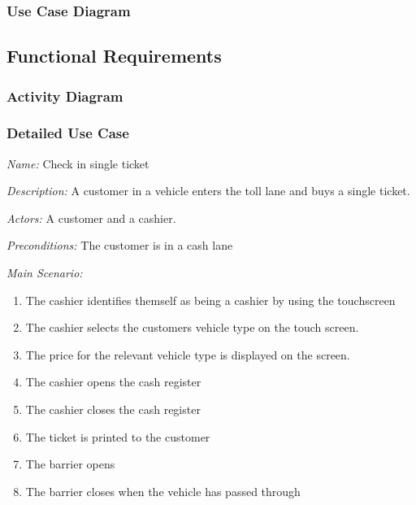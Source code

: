 \subsubsection {Use Case Diagram}

\subsection{Functional Requirements}

\subsubsection{Activity Diagram}

\subsubsection{Detailed Use Case}

\textit {Name: } Check in single ticket

\textit {Description: } A customer in a vehicle enters the toll lane and buys a single ticket.

\textit {Actors: } A customer and a cashier.

\textit {Preconditions: }  The customer is in a cash lane

\textit{Main Scenario: }

\begin{enumerate}
	\item The cashier identifies themself as being a cashier by using the touchscreen
	\item The cashier selects the customers vehicle type on the touch screen.
	\item The price for the relevant vehicle type is displayed on the screen.
	\item The cashier opens the cash register
	\item The cashier closes the cash register
	\item The ticket is printed to the customer
	\item The barrier opens
	\item The barrier closes when the vehicle has passed through
\end{enumerate}

